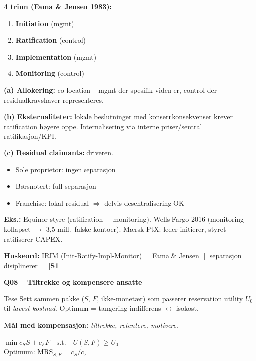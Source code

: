 \documentclass[10pt, a4paper]{article}
\newcommand{\SOne}{\textcolor{s1color}{\textbf{[S1]}}}
\newcommand{\qhead}[2]{%
  \noindent
  \begin{tcolorbox}[colback=boxborder, colframe=boxborder, arc=2pt, left=6pt, right=6pt, top=2pt, bottom=2pt]
    \color{white}\textbf{\large Q#1 -- #2}
  \end{tcolorbox}
}
\newcommand{\huskeord}[1]{%
  \vspace{2pt}
  \begin{tcolorbox}[colback=yellow!15, colframe=orange!70!black, boxrule=0.4pt, arc=2pt, left=4pt, right=4pt, top=2pt, bottom=2pt]
    \footnotesize\textbf{Huskeord:} #1
  \end{tcolorbox}
}
\begin{document}
\textbf{4 trinn (Fama \& Jensen 1983):}
\begin{enumerate}
  \item \textbf{Initiation} (mgmt)
  \item \textbf{Ratification} (control)
  \item \textbf{Implementation} (mgmt)
  \item \textbf{Monitoring} (control)
\end{enumerate}

\textbf{(a) Allokering:} co-location -- mgmt der spesifik viden er, control der residualkravshaver representeres.

\textbf{(b) Eksternaliteter:} lokale beslutninger med konsernkonsekvenser krever ratification høyere oppe. Internalisering via interne priser/sentral ratifikasjon/KPI.

\textbf{(c) Residual claimants:} driveren.
\begin{itemize}
  \item Sole proprietor: ingen separasjon
  \item Børsnotert: full separasjon
  \item Franchise: lokal residual $\Rightarrow$ delvis desentralisering OK
\end{itemize}

\textbf{Eks.:} Equinor styre (ratification + monitoring). Wells Fargo 2016 (monitoring kollapset $\to$ 3,5 mill.\ falske kontoer). Mærsk PtX: leder initierer, styret ratifiserer CAPEX.

\huskeord{IRIM (Init-Ratify-Impl-Monitor) $\;\big|\;$ Fama \& Jensen $\;\big|\;$ separasjon disiplinerer $\;\big|\;$ \SOne}

\vfill\newpage

\qhead{08}{Tiltrekke og kompensere ansatte}

\begin{keybox}{Tese}
Sett sammen pakke ($S$, $F$, ikke-monetær) som passerer reservation utility $U_0$ til \emph{lavest kostnad}. Optimum = tangering indifferens $\leftrightarrow$ isokost.
\end{keybox}

\textbf{Mål med kompensasjon:} \emph{tiltrekke, retentere, motivere}.

\begin{formulabox}
$\min c_S S + c_F F \quad \text{s.t.} \quad U(S,F) \geq U_0$ \\
Optimum: $\mathrm{MRS}_{S,F} = c_S / c_F$
\end{formulabox}
\end{document}
